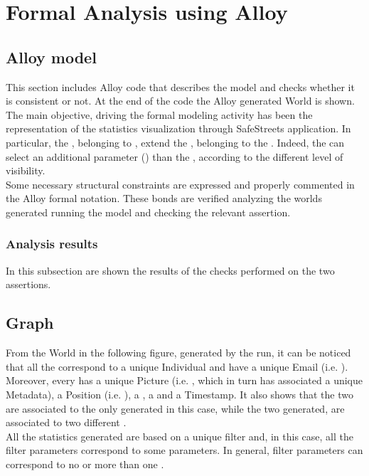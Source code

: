 \documentclass[../rasd.tex]{subfiles}
\begin{document}
\chapter{Formal Analysis using Alloy}
\thispagestyle{fancy}
	\section{Alloy model}
	
	This section includes Alloy code that describes the model and checks whether it is consistent or not. At the end of the code the Alloy generated World is shown. \\
	The main objective, driving the formal modeling activity has been the representation of the statistics visualization through SafeStreets application. In particular, the , belonging to , extend the , belonging to the . Indeed, the  can select an additional parameter () than the , according to the different level of visibility. \\
	Some necessary structural constraints are expressed and properly commented in the Alloy formal notation. These bonds are verified analyzing the worlds generated running the model and checking the relevant assertion. \\
	
	

		\subsection{Analysis results}
		
		In this subsection are shown the results of the checks performed on the two assertions. 
	\section{Graph}
	
	From the World in the following figure, generated by the run, it can be noticed that all the  correspond to a unique Individual and have a unique Email (i.e. ). Moreover, every  has a unique Picture (i.e. , which in turn has associated a unique Metadata), a Position (i.e. ), a , a  and a Timestamp. It also shows that the two  are associated to the only  generated in this case, while the two  generated, are associated to two different . \\
	All the statistics generated are based on a unique filter and, in this case, all the filter parameters correspond to some  parameters.
	In general, filter parameters can correspond to no or more than one . 
	
\end{document}
